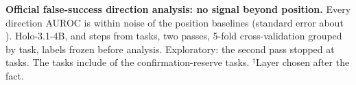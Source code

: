 \begin{table}[t]
\centering\small

\caption{\textbf{Official false-success direction analysis: no signal beyond position.} Every direction AUROC is within noise of the position baselines (standard error about \ofResidSe). Holo-3.1-4B, \ofPos{} \fsp{} and \ofNeg{} \fsm{} steps from \ofTasks{} tasks, two passes, 5-fold cross-validation grouped by task, labels frozen before analysis. Exploratory: the second pass stopped at \rtmPassTwoScored{} tasks. The \ofTasks{} tasks include \ofReserveIn{} of the \ofReserveN{} confirmation-reserve tasks. $^\dagger$Layer chosen after the fact.}
\label{tab:fs-auc}
\end{table}
